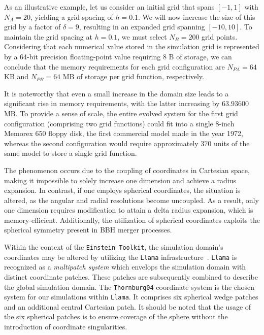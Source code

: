 As an illustrative example, let us consider an initial grid that spans $[-1,1]$ with $N_A=20$, yielding a grid spacing of $h=0.1$. We will now increase the size of this grid by a factor of $\delta=9$, resulting in an expanded grid spanning $[-10,10]$. To maintain the grid spacing at $h=0.1$, we must select $N_B=200$ grid points. Considering that each numerical value stored in the simulation grid is represented by a 64-bit precision floating-point value requiring 8 B of storage, we can conclude that the memory requirements for each grid configuration are $N_{PA}=64$ KB and $N_{PB}=64$ MB of storage per grid function, respectively.

It is noteworthy that even a small increase in the domain size leads to a significant rise in memory requirements, with the latter increasing by $63.93600$ MB. To provide a sense of scale, the entire evolved system for the first grid configuration (comprising two grid functions) could fit into a single 8-inch Memorex 650 floppy disk, the first commercial model made in the year 1972, whereas the second configuration would require approximately $370$ units of the same model to store a single grid function.

The phenomenon occurs due to the coupling of coordinates in Cartesian space, making it impossible to solely increase one dimension and achieve a radius expansion. In contrast, if one employs spherical coordinates, the situation is altered, as the angular and radial resolutions become uncoupled. As a result, only one dimension requires modification to attain a delta radius expansion, which is memory-efficient. Additionally, the utilization of spherical coordinates exploits the spherical symmetry present in BBH merger processes.

Within the context of the \texttt{Einstein Toolkit}, the simulation domain's coordinates may be altered by utilizing the \texttt{Llama} infrastructure~\cite{Reisswig2010,PhysRevD.83.044045}. \texttt{Llama} is recognized as a \textit{multipatch system} which envelops the simulation domain with distinct coordinate patches. These patches are subsequently combined to describe the global simulation domain. The \texttt{Thornburg04} coordinate system is the chosen system for our simulations within \texttt{Llama}. It comprises six spherical wedge patches and an additional central Cartesian patch. It should be noted that the usage of the six spherical patches is to ensure coverage of the sphere without the introduction of coordinate singularities.

